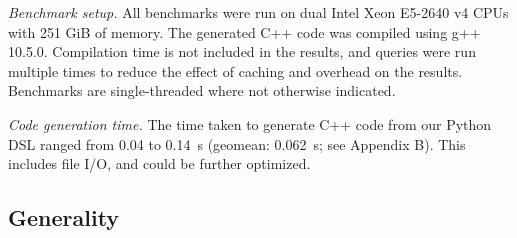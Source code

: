 \documentclass[acmsmall,screen,nonacm]{acmart}\settopmatter{printfolios=true,printccs=false,printacmref=false}
\begin{document}
\emph{Benchmark setup.}
All benchmarks were run on dual Intel Xeon E5-2640 v4 CPUs with 251 GiB of memory. The generated C++ code was compiled using g++ 10.5.0. Compilation time is not included in the results, and queries were run multiple times to reduce the effect of caching and overhead on the results. Benchmarks are single-threaded where not otherwise indicated.

\emph{Code generation time.}
The time taken to generate C++ code from our Python DSL ranged from 0.04 to 0.14~s (geomean: 0.062~s; see Appendix B). This includes file I/O, and could be further optimized.

\subsection{Generality}
\label{sec:generality}
\end{document}
